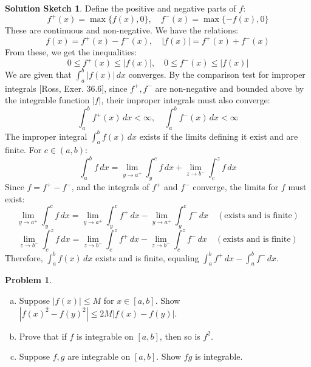 \documentclass{article}
\theoremstyle{definition} %
\newtheorem{problem}{Problem}
\theoremstyle{definition} %
\newtheorem*{solution}{Solution Sketch}
\begin{document}
\begin{solution}
Define the positive and negative parts of $f$:
\[ f^+(x) = \max\{f(x), 0\}, \quad f^-(x) = \max\{-f(x), 0\} \]
These are continuous and non-negative. We have the relations:
\[ f(x) = f^+(x) - f^-(x), \quad |f(x)| = f^+(x) + f^-(x) \]
From these, we get the inequalities:
\[ 0 \le f^+(x) \le |f(x)|, \quad 0 \le f^-(x) \le |f(x)| \]
We are given that $\int_a^b |f(x)| \, dx$ converges. By the comparison test for improper integrals [Ross, Exer. 36.6], since $f^+, f^-$ are non-negative and bounded above by the integrable function $|f|$, their improper integrals must also converge:
\[ \int_a^b f^+(x) \, dx < \infty, \quad \int_a^b f^-(x) \, dx < \infty \]
The improper integral $\int_a^b f(x) \, dx$ exists if the limits defining it exist and are finite. For $c \in (a,b)$:
\[ \int_a^b f \, dx = \lim_{y \to a^+} \int_y^c f \, dx + \lim_{z \to b^-} \int_c^z f \, dx \]
Since $f = f^+ - f^-$, and the integrals of $f^+$ and $f^-$ converge, the limits for $f$ must exist:
\[ \lim_{y \to a^+} \int_y^c f \, dx = \lim_{y \to a^+} \int_y^c f^+ \, dx - \lim_{y \to a^+} \int_y^c f^- \, dx \quad (\text{exists and is finite}) \]
\[ \lim_{z \to b^-} \int_c^z f \, dx = \lim_{z \to b^-} \int_c^z f^+ \, dx - \lim_{z \to b^-} \int_c^z f^- \, dx \quad (\text{exists and is finite}) \]
Therefore, $\int_a^b f(x) \, dx$ exists and is finite, equaling $\int_a^b f^+ \, dx - \int_a^b f^- \, dx$.
\end{solution}

\begin{problem}
\begin{enumerate}[(a)]
  \item Suppose $|f(x)|\le M$ for $x\in[a,b]$. Show $|f(x)^2-f(y)^2| \le 2M |f(x)-f(y)|$.
  \item Prove that if $f$ is integrable on $[a,b]$, then so is $f^2$.
  \item Suppose $f, g$ are integrable on $[a,b]$. Show $fg$ is integrable.
\end{enumerate}
\end{problem}
\end{document}
